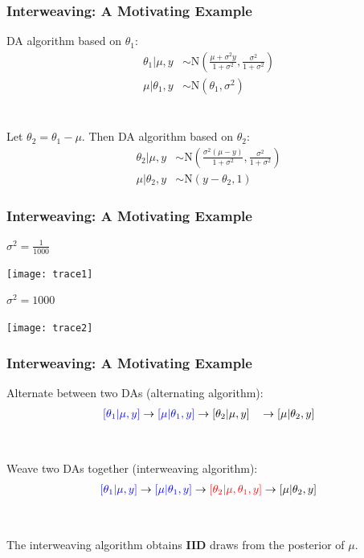 \documentclass[xcolor=dvipsnames]{beamer}
\newcommand\N{\mathrm{N}}
\begin{document}
\begin{frame}
\frametitle{Interweaving: A Motivating Example}

DA algorithm based on $\theta_1$:
\begin{align*}
\theta_1|\mu,y &\sim \N\left(\frac{\mu + \sigma^2y}{1+\sigma^2}, \frac{\sigma^2}{1+\sigma^2}\right)\\
\mu |\theta_1, y &\sim \N(\theta_1, \sigma^2)
\end{align*}\\~\\

\pause Let $\theta_2 = \theta_1 - \mu$. Then DA algorithm based on $\theta_2$:
\begin{align*}
\theta_2|\mu,y &\sim \N\left(\frac{\sigma^2(\mu - y)}{1+\sigma^2}, \frac{\sigma^2}{1+\sigma^2}\right)\\
\mu |\theta_2, y &\sim \N(y-\theta_2, 1)
\end{align*}
\end{frame}

\begin{frame}
\frametitle{Interweaving: A Motivating Example}
$\sigma^2=\frac{1}{1000}$
\begin{center}
\texttt{[image: trace1]}\\
\end{center}
$\sigma^2=1000$
\begin{center}
\texttt{[image: trace2]}
\end{center}
\end{frame}

\begin{frame}
\frametitle{Interweaving: A Motivating Example}
Alternate between two DAs (alternating algorithm):
\begin{align*}
{\color{blue}[\theta_1|\mu,y]} \to {\color{blue}[\mu|\theta_1,y]} \to [\theta_2|\mu,y]\phantom{\theta_1} \to [\mu|\theta_2,y]
\end{align*}\\~\\
\pause Weave two DAs together (interweaving algorithm):
\begin{align*}
{\color{blue}[\theta_1|\mu,y]} \to {\color{blue}[\mu|\theta_1,y]} \to {\color{red}[\theta_2|\mu,\theta_1,y]} \to [\mu|\theta_2,y]
\end{align*}\\~\\\pause
The interweaving algorithm obtains {\bf IID} draws from the posterior of $\mu$.
\end{frame}
\end{document}
